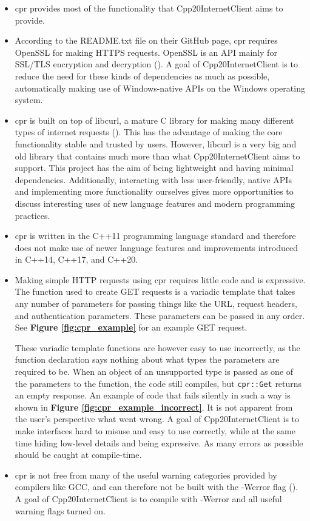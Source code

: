 \documentclass[12pt, a4paper]{article}
\begin{document}
\begin{itemize}
	\item cpr provides most of the functionality that Cpp20InternetClient aims to provide.
	\item According to the README.txt file on their GitHub page, cpr requires OpenSSL for making HTTPS requests. OpenSSL is an API mainly for SSL/TLS encryption and decryption (\cite{OpenSSL}). A goal of Cpp20InternetClient is to reduce the need for these kinds of dependencies as much as possible, automatically making use of Windows-native APIs on the Windows operating system. 
	\item cpr is built on top of libcurl, a mature C library for making many different types of internet requests (\cite{Libcurl}). This has the advantage of making the core functionality stable and trusted by users. However, libcurl is a very big and old library that contains much more than what Cpp20InternetClient aims to support. This project has the aim of being lightweight and having minimal dependencies. Additionally, interacting with less user-friendly, native APIs and implementing more functionality ourselves gives more opportunities to discuss interesting uses of new language features and modern programming practices.
	\item cpr is written in the C++11 programming language standard and therefore does not make use of newer language features and improvements introduced in C++14, C++17, and C++20.
	\item Making simple HTTP requests using cpr requires little code and is expressive. The function used to create GET requests is a variadic template that takes any number of parameters for passing things like the URL, request headers, and authentication parameters. These parameters can be passed in any order. See \textbf{Figure \ref{fig:cpr_example}} for an example GET request.

	These variadic template functions are however easy to use incorrectly, as the function declaration says nothing about what types the parameters are required to be. When an object of an unsupported type is passed as one of the parameters to the function, the code still compiles, but \texttt{cpr::Get} returns an empty response. An example of code that fails silently in such a way is shown in \textbf{Figure \ref{fig:cpr_example_incorrect}}. It is not apparent from the user’s perspective what went wrong. A goal of Cpp20InternetClient is to make interfaces hard to misuse and easy to use correctly, while at the same time hiding low-level details and being expressive. As many errors as possible should be caught at compile-time.
	\item cpr is not free from many of the useful warning categories provided by compilers like GCC, and can therefore not be built with the -Werror flag (\cite{GccWarnings}). A goal of Cpp20InternetClient is to compile with -Werror and all useful warning flags turned on.
\end{itemize}
\end{document}

